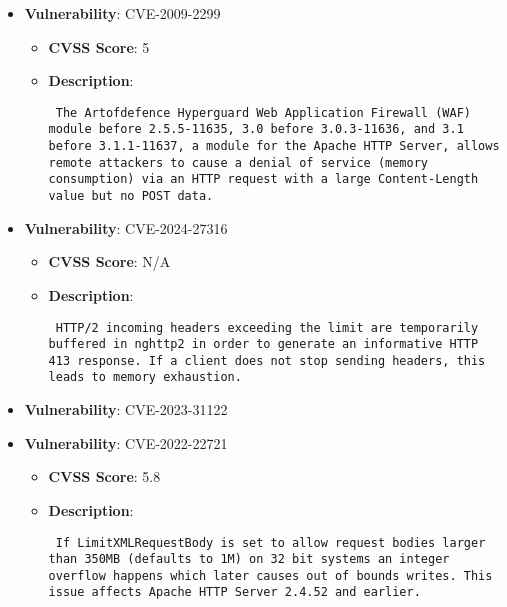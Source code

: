 \documentclass{article}
\begin{document}
\begin{itemize}
        \item \textbf{Vulnerability}: CVE-2009-2299
        \begin{itemize}
            \item \textbf{CVSS Score}:  5 
            \item \textbf{Description}: \parbox{\linewidth}{\texttt{ The Artofdefence Hyperguard Web Application Firewall (WAF) module before 2.5.5-11635, 3.0 before 3.0.3-11636, and 3.1 before 3.1.1-11637, a module for the Apache HTTP Server, allows remote attackers to cause a denial of service (memory consumption) via an HTTP request with a large Content-Length value but no POST data. }}
        \end{itemize}
    
        \item \textbf{Vulnerability}: CVE-2024-27316
        \begin{itemize}
            \item \textbf{CVSS Score}:  N/A 
            \item \textbf{Description}: \parbox{\linewidth}{\texttt{ HTTP/2 incoming headers exceeding the limit are temporarily buffered in nghttp2 in order to generate an informative HTTP 413 response. If a client does not stop sending headers, this leads to memory exhaustion. }}
        \end{itemize}
    
        \item \textbf{Vulnerability}: CVE-2023-31122
    
        \item \textbf{Vulnerability}: CVE-2022-22721
        \begin{itemize}
            \item \textbf{CVSS Score}:  5.8 
            \item \textbf{Description}: \parbox{\linewidth}{\texttt{ If LimitXMLRequestBody is set to allow request bodies larger than 350MB (defaults to 1M) on 32 bit systems an integer overflow happens which later causes out of bounds writes. This issue affects Apache HTTP Server 2.4.52 and earlier. }}
        \end{itemize}
    

\end{itemize}
\end{document}
